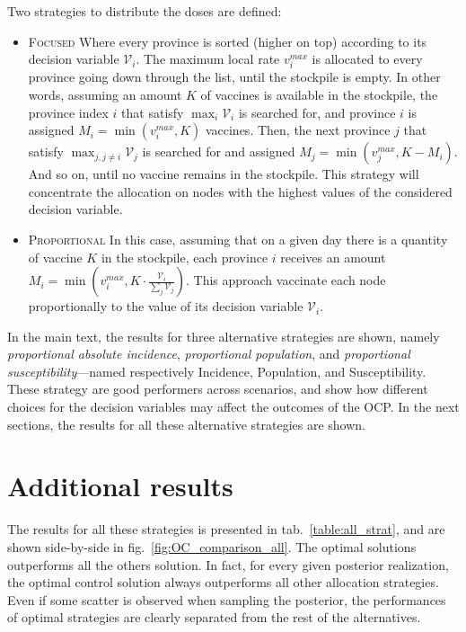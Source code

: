 Two strategies to distribute the doses are defined:
\begin{itemize}
\item \textsc{Focused} Where every province is sorted (higher on top) according to its decision variable $\mathcal{V}_i$. The maximum local rate $v_i^{max}$ is allocated to every province going down through the list, until the stockpile is empty. In other words, assuming an amount $K$ of vaccines is available in the stockpile, the province index $i$ that satisfy $\max_i \mathcal{V}_i$ is searched for, and province $i$ is assigned $M_i = \min(v_i^{max}, K)$ vaccines. Then, the next province $j$ that satisfy $\max_{j,j\neq i} \mathcal{V}_j$ is searched for and assigned $M_j = \min(v_j^{max}, K-M_i)$. And so on, until no vaccine remains in the stockpile. This strategy will concentrate the allocation on nodes with the highest values of the considered decision variable.
\item \textsc{Proportional} In this case, assuming that on a given day there is a quantity of vaccine $K$ in the stockpile, each province $i$ receives an amount $M_i = \min(v_i^{max}, K \cdot \frac{\mathcal{V}_i}{\sum_j \mathcal{V}_j})$. This approach vaccinate each node proportionally to the value of its decision variable $\mathcal{V}_i$.
\end{itemize}
In the main text, the results for three alternative strategies are shown, namely \textit{proportional absolute incidence}, \textit{proportional population}, and \textit{proportional susceptibility}---named respectively Incidence, Population, and Susceptibility. These strategy are good performers across scenarios, and show how different choices for the decision variables may affect the outcomes of the OCP. In the next sections, the results for all these alternative strategies are shown.

\section{Additional results}
The results for all these strategies is presented in tab.~\ref{table:all_strat}, and are shown side-by-side in fig.~\ref{fig:OC_comparison_all}. The optimal solutions outperforms all the others solution. In fact, for every given posterior realization, the optimal control solution always outperforms all other allocation strategies. Even if some scatter is observed when sampling the posterior, the performances of optimal strategies are clearly separated from the rest of the alternatives.

